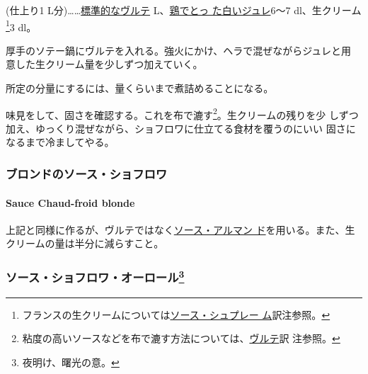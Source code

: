 \begin{recette}
(仕上り1
L分)\ldots{}\ldots{}\protect\hyperlink{veloute}{標準的なヴルテ}\troisquarts{}
L、\protect\hyperlink{gelee-de-volaille}{鶏でとっ た白いジュレ}6〜7
dl、生クリーム\footnote{フランスの生クリームについては\protect\hyperlink{sauce-supreme}{ソース・シュプレー
  ム}訳注参照。}3 dl。

厚手のソテー鍋にヴルテを入れる。強火にかけ、ヘラで混ぜながらジュレと用
意した生クリーム\untiers{}量を少しずつ加えていく。

所定の分量にするには、\deuxtiers{}量くらいまで煮詰めることになる。

味見をして、固さを確認する。これを布で漉す\footnote{粘度の高いソースなどを布で漉す方法については、\protect\hyperlink{veloute}{ヴルテ}訳
  注参照。}。生クリームの残りを少
しずつ加え、ゆっくり混ぜながら、ショフロワに仕立てる食材を覆うのにいい
固さになるまで冷ましてやる。

\maeaki

\hypertarget{ux30d6ux30edux30f3ux30c9ux306eux30bdux30fcux30b9ux30b7ux30e7ux30d5ux30edux30ef}{%
\subsubsection{ブロンドのソース・ショフロワ}\label{ux30d6ux30edux30f3ux30c9ux306eux30bdux30fcux30b9ux30b7ux30e7ux30d5ux30edux30ef}}

\hypertarget{sauce-chaud-froid-blonde}{%
\paragraph{Sauce Chaud-froid blonde}\label{sauce-chaud-froid-blonde}}


上記と同様に作るが、ヴルテではなく\protect\hyperlink{sauce-allemande}{ソース・アルマン
ド}を用いる。また、生クリームの量は半分に減らすこと。

\maeaki

\hypertarget{ux30bdux30fcux30b9ux30b7ux30e7ux30d5ux30edux30efux30aaux30fcux30edux30fcux30eb28}{%
\subsubsection[ソース・ショフロワ・オーロール]{\texorpdfstring{ソース・ショフロワ・オーロール\footnote{夜明け、曙光の意。}}{ソース・ショフロワ・オーロール}}\label{ux30bdux30fcux30b9ux30b7ux30e7ux30d5ux30edux30efux30aaux30fcux30edux30fcux30eb28}}


\end{recette}
